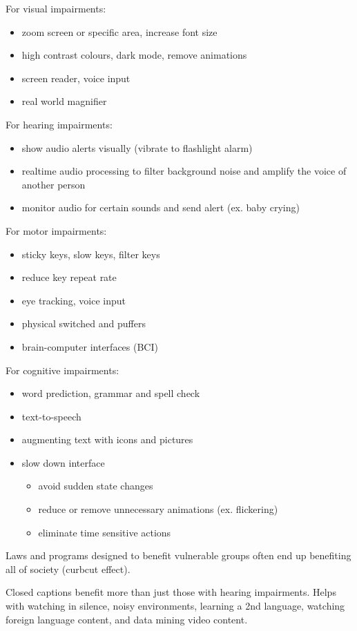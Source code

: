 \documentclass[11pt]{article}
\begin{document}
For visual impairments:
\begin{itemize}
\item zoom screen or specific area, increase font size
\item high contrast colours, dark mode, remove animations
\item screen reader, voice input
\item real world magnifier
\end{itemize}

For hearing impairments:
\begin{itemize}
\item show audio alerts visually (vibrate to flashlight alarm)
\item realtime audio processing to filter background noise and amplify the voice of another
person
\item monitor audio for certain sounds and send alert (ex. baby crying)
\end{itemize}

For motor impairments:
\begin{itemize}
\item sticky keys, slow keys, filter keys
\item reduce key repeat rate
\item eye tracking, voice input
\item physical switched and puffers
\item brain-computer interfaces (BCI)
\end{itemize}

For cognitive impairments:
\begin{itemize}
\item word prediction, grammar and spell check
\item text-to-speech
\item augmenting text with icons and pictures
\item slow down interface
\begin{itemize}
\item avoid sudden state changes
\item reduce or remove unnecessary animations (ex. flickering)
\item eliminate time sensitive actions
\end{itemize}
\end{itemize}

Laws and programs designed to benefit vulnerable groups often end up benefiting
all of society (curbcut effect).

Closed captions benefit more than just those with hearing impairments.
Helps with watching in silence, noisy environments, learning a 2nd language,
watching foreign language content, and data mining video content.
\end{document}
